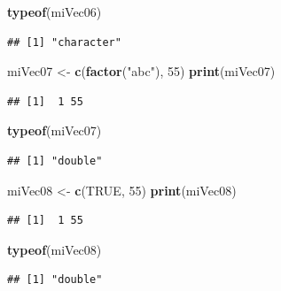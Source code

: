 \documentclass[]{book}
\newenvironment{Shaded}{\begin{snugshade}}{\end{snugshade}}
\newcommand{\KeywordTok}[1]{\textcolor[rgb]{0.13,0.29,0.53}{\textbf{#1}}}
\newcommand{\DecValTok}[1]{\textcolor[rgb]{0.00,0.00,0.81}{#1}}
\newcommand{\StringTok}[1]{\textcolor[rgb]{0.31,0.60,0.02}{#1}}
\newcommand{\OtherTok}[1]{\textcolor[rgb]{0.56,0.35,0.01}{#1}}
\newcommand{\NormalTok}[1]{#1}
\begin{document}
\begin{Shaded}
\begin{Highlighting}[]
\KeywordTok{typeof}\NormalTok{(miVec06)}
\end{Highlighting}
\end{Shaded}

\begin{verbatim}
## [1] "character"
\end{verbatim}

\begin{Shaded}
\begin{Highlighting}[]
\NormalTok{miVec07 <-}\StringTok{ }\KeywordTok{c}\NormalTok{(}\KeywordTok{factor}\NormalTok{(}\StringTok{"abc"}\NormalTok{), }\DecValTok{55}\NormalTok{)}
\KeywordTok{print}\NormalTok{(miVec07)}
\end{Highlighting}
\end{Shaded}

\begin{verbatim}
## [1]  1 55
\end{verbatim}

\begin{Shaded}
\begin{Highlighting}[]
\KeywordTok{typeof}\NormalTok{(miVec07)}
\end{Highlighting}
\end{Shaded}

\begin{verbatim}
## [1] "double"
\end{verbatim}

\begin{Shaded}
\begin{Highlighting}[]
\NormalTok{miVec08 <-}\StringTok{ }\KeywordTok{c}\NormalTok{(}\OtherTok{TRUE}\NormalTok{, }\DecValTok{55}\NormalTok{)}
\KeywordTok{print}\NormalTok{(miVec08)}
\end{Highlighting}
\end{Shaded}

\begin{verbatim}
## [1]  1 55
\end{verbatim}

\begin{Shaded}
\begin{Highlighting}[]
\KeywordTok{typeof}\NormalTok{(miVec08)}
\end{Highlighting}
\end{Shaded}

\begin{verbatim}
## [1] "double"
\end{verbatim}
\end{document}
